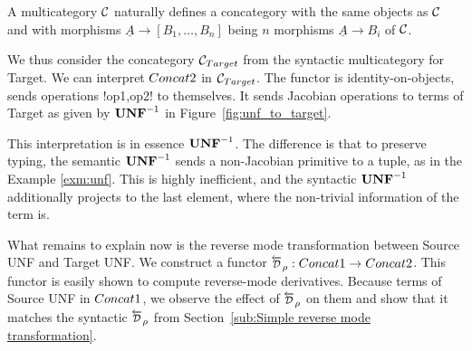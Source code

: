 \begin{definition}
    A multicategory $\mathcal{C}$ naturally defines a concategory with the same objects as $\mathcal{C}$ and
    with morphisms $\underline{A}\to [B_1,\ldots,B_n]$ being $n$ morphisms $\underline{A}\to B_i$ of $\mathcal{C}$. 
\end{definition}

We thus consider the concategory $\mathcal{C}_{Target}$ from the syntactic multicategory for Target.
We can interpret $Concat2$ in $\mathcal{C}_{Target}$. 
The functor is identity-on-objects, sends operations !op1,op2! to themselves. 
It sends Jacobian operations to terms of Target as given by $\mathbf{UNF}^{-1}$ in Figure~\ref{fig:unf_to_target}.

This interpretation is in essence $\mathbf{UNF}^{-1}$. 
The difference is that to preserve typing, the semantic $\mathbf{UNF}^{-1}$
sends a non-Jacobian primitive to a tuple, as in the Example \ref{exm:unf}. 
This is highly inefficient, and the syntactic $\mathbf{UNF}^{-1}$ 
additionally projects to the last element, where the non-trivial information of the term is.

What remains to explain now is the reverse mode transformation between Source UNF and Target UNF.
We construct a functor $\Dsynrevsymbol_{\rho}:\ConcatS\to\ConcatT$. 
This functor is easily shown to compute reverse-mode derivatives.
Because terms of Source UNF in $Concat1$, we observe the effect of $\Dsynrevsymbol_{\rho}$ on them
and show that it matches the syntactic $\Dsynrevsymbol_{\rho}$ 
from Section~\ref{sub:Simple reverse mode transformation}.

